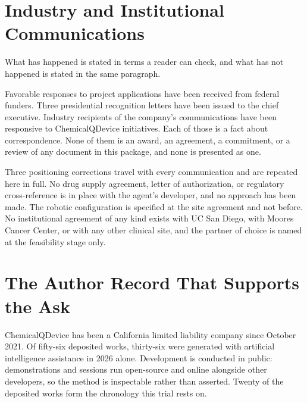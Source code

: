 \section{Industry and Institutional Communications}

What has happened is stated in terms a reader can check, and what has not
happened is stated in the same paragraph.

Favorable responses to project applications have been received from federal
funders. Three presidential recognition letters have been issued to the chief
executive. Industry recipients of the company's communications have been
responsive to ChemicalQDevice initiatives. Each of those is a fact about
correspondence. None of them is an award, an agreement, a commitment, or a
review of any document in this package, and none is presented as one.

Three positioning corrections travel with every communication and are repeated
here in full. No drug supply agreement, letter of authorization, or regulatory
cross-reference is in place with the agent's developer, and no approach has been
made. The robotic configuration is specified at the site agreement and not
before. No institutional agreement of any kind exists with UC San Diego, with
Moores Cancer Center, or with any other clinical site, and the partner of choice
is named at the feasibility stage only.

\section{The Author Record That Supports the Ask}

ChemicalQDevice has been a California limited liability company since October
2021. Of fifty-six deposited works, thirty-six were generated with artificial
intelligence assistance in 2026 alone. Development is conducted in public:
demonstrations and sessions run open-source and online alongside other
developers, so the method is inspectable rather than asserted. Twenty of the
deposited works form the chronology this trial rests on.

